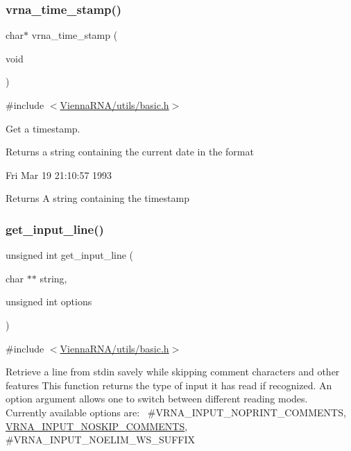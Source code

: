 \subsubsection{\texorpdfstring{vrna\+\_\+time\+\_\+stamp()}{vrna\_time\_stamp()}}
{\footnotesize\ttfamily char$\ast$ vrna\+\_\+time\+\_\+stamp (\begin{DoxyParamCaption}\item[{void}]{ }\end{DoxyParamCaption})}



{\ttfamily \#include $<$\hyperlink{utils_2basic_8h}{Vienna\+R\+N\+A/utils/basic.\+h}$>$}



Get a timestamp. 

Returns a string containing the current date in the format \begin{DoxyVerb}Fri Mar 19 21:10:57 1993 \end{DoxyVerb}


\begin{DoxyReturn}{Returns}
A string containing the timestamp 
\end{DoxyReturn}
\mbox{\label{group__utils_ga8ef1835eb83f542396f59f0b205965e5}} 
\subsubsection{\texorpdfstring{get\+\_\+input\+\_\+line()}{get\_input\_line()}}
{\footnotesize\ttfamily unsigned int get\+\_\+input\+\_\+line (\begin{DoxyParamCaption}\item[{char $\ast$$\ast$}]{string,  }\item[{unsigned int}]{options }\end{DoxyParamCaption})}



{\ttfamily \#include $<$\hyperlink{utils_2basic_8h}{Vienna\+R\+N\+A/utils/basic.\+h}$>$}

Retrieve a line from \textquotesingle{}stdin\textquotesingle{} savely while skipping comment characters and other features This function returns the type of input it has read if recognized. An option argument allows one to switch between different reading modes.~\newline
Currently available options are\+:~\newline
\#\+V\+R\+N\+A\+\_\+\+I\+N\+P\+U\+T\+\_\+\+N\+O\+P\+R\+I\+N\+T\+\_\+\+C\+O\+M\+M\+E\+N\+TS, \hyperlink{group__utils_ga0f6311f11bed1842e3a527ab27b294c6}{V\+R\+N\+A\+\_\+\+I\+N\+P\+U\+T\+\_\+\+N\+O\+S\+K\+I\+P\+\_\+\+C\+O\+M\+M\+E\+N\+TS}, \#\+V\+R\+N\+A\+\_\+\+I\+N\+P\+U\+T\+\_\+\+N\+O\+E\+L\+I\+M\+\_\+\+W\+S\+\_\+\+S\+U\+F\+F\+IX

